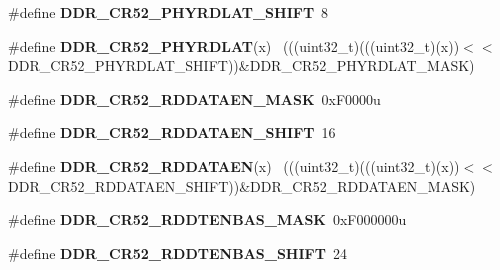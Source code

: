 \begin{DoxyCompactItemize}
\item 
\hypertarget{group___d_d_r___register___masks_gad07b71d26ad1ab36af1316c1de85634b}{}\#define {\bfseries D\+D\+R\+\_\+\+C\+R52\+\_\+\+P\+H\+Y\+R\+D\+L\+A\+T\+\_\+\+S\+H\+I\+F\+T}~8\label{group___d_d_r___register___masks_gad07b71d26ad1ab36af1316c1de85634b}

\item 
\hypertarget{group___d_d_r___register___masks_gaa05772a72df194c3842d7a5f601f9067}{}\#define {\bfseries D\+D\+R\+\_\+\+C\+R52\+\_\+\+P\+H\+Y\+R\+D\+L\+A\+T}(x)                                      ~(((uint32\+\_\+t)(((uint32\+\_\+t)(x))$<$$<$D\+D\+R\+\_\+\+C\+R52\+\_\+\+P\+H\+Y\+R\+D\+L\+A\+T\+\_\+\+S\+H\+I\+F\+T))\&D\+D\+R\+\_\+\+C\+R52\+\_\+\+P\+H\+Y\+R\+D\+L\+A\+T\+\_\+\+M\+A\+S\+K)\label{group___d_d_r___register___masks_gaa05772a72df194c3842d7a5f601f9067}

\item 
\hypertarget{group___d_d_r___register___masks_gab29dc5621818b958b7b3b908bb90a62d}{}\#define {\bfseries D\+D\+R\+\_\+\+C\+R52\+\_\+\+R\+D\+D\+A\+T\+A\+E\+N\+\_\+\+M\+A\+S\+K}~0x\+F0000u\label{group___d_d_r___register___masks_gab29dc5621818b958b7b3b908bb90a62d}

\item 
\hypertarget{group___d_d_r___register___masks_ga1b553de0a345bec973a9a301385a2270}{}\#define {\bfseries D\+D\+R\+\_\+\+C\+R52\+\_\+\+R\+D\+D\+A\+T\+A\+E\+N\+\_\+\+S\+H\+I\+F\+T}~16\label{group___d_d_r___register___masks_ga1b553de0a345bec973a9a301385a2270}

\item 
\hypertarget{group___d_d_r___register___masks_ga6df626b86a5a198e500429414f49a6e7}{}\#define {\bfseries D\+D\+R\+\_\+\+C\+R52\+\_\+\+R\+D\+D\+A\+T\+A\+E\+N}(x)                                      ~(((uint32\+\_\+t)(((uint32\+\_\+t)(x))$<$$<$D\+D\+R\+\_\+\+C\+R52\+\_\+\+R\+D\+D\+A\+T\+A\+E\+N\+\_\+\+S\+H\+I\+F\+T))\&D\+D\+R\+\_\+\+C\+R52\+\_\+\+R\+D\+D\+A\+T\+A\+E\+N\+\_\+\+M\+A\+S\+K)\label{group___d_d_r___register___masks_ga6df626b86a5a198e500429414f49a6e7}

\item 
\hypertarget{group___d_d_r___register___masks_gab57089278ba77a206c0b68dc9e3d0b19}{}\#define {\bfseries D\+D\+R\+\_\+\+C\+R52\+\_\+\+R\+D\+D\+T\+E\+N\+B\+A\+S\+\_\+\+M\+A\+S\+K}~0x\+F000000u\label{group___d_d_r___register___masks_gab57089278ba77a206c0b68dc9e3d0b19}

\item 
\hypertarget{group___d_d_r___register___masks_gad5fed8a238d80b95700c78c8021badd5}{}\#define {\bfseries D\+D\+R\+\_\+\+C\+R52\+\_\+\+R\+D\+D\+T\+E\+N\+B\+A\+S\+\_\+\+S\+H\+I\+F\+T}~24\label{group___d_d_r___register___masks_gad5fed8a238d80b95700c78c8021badd5}


\end{DoxyCompactItemize}
